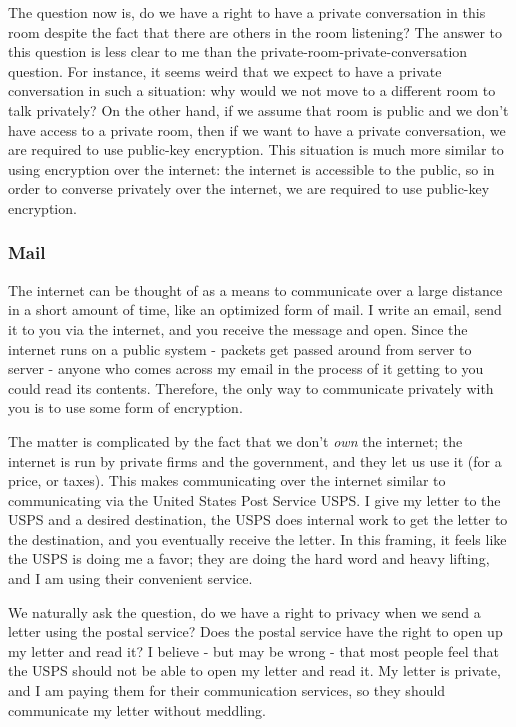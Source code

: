 \documentclass[11pt]{article}
\begin{document}
The question now is, do we have a right to have a private conversation in this room despite the fact that there are others in the room listening?
The answer to this question is less clear to me than the private-room-private-conversation question.
For instance, it seems weird that we expect to have a private conversation in such a situation: why would we not move to a different room to talk privately?
On the other hand, if we assume that room is public and  we don't have access to a private room, then if we want to have a private conversation, we are required to use public-key encryption.
This situation is much more similar to using encryption over the internet: the internet is accessible to the public, so in order to converse privately over the internet, we are required to use public-key encryption.

\subsubsection{Mail}

The internet can be thought of as a means to communicate over a large distance in a short amount of time, like an optimized form of mail.
I write an email, send it to you via the internet, and you receive the message and open.
Since the internet runs on a public system - packets get passed around from server to server - anyone who comes across my email in the process of it getting to you could read its contents.
Therefore, the only way to communicate privately with you is to use some form of encryption.

The matter is complicated by the fact that we don't \textit{own} the internet; the internet is run by private firms and the government, and they let us use it (for a price, or taxes). 
This makes communicating over the internet similar to communicating via the United States Post Service USPS.
I give my letter to the USPS and a desired destination, the USPS does internal work to get the letter to the destination, and you eventually receive the letter.
In this framing, it feels like the USPS is doing me a favor; they are doing the hard word and heavy lifting, and I am using their convenient service.

We naturally ask the question, do we have a right to privacy when we send a letter using the postal service?
Does the postal service have the right to open up my letter and read it?
I believe - but may be wrong - that most people feel that the USPS should not be able to open my letter and read it. 
My letter is private, and I am paying them for their communication services, so they should communicate my letter without meddling.
\end{document}
